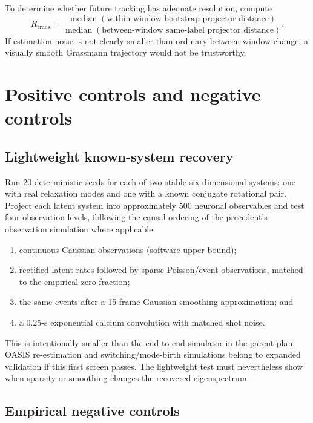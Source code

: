 \documentclass[11pt,a4paper]{article}
\begin{document}
To determine whether future tracking has adequate resolution, compute
\begin{equation}
 R_{\mathrm{track}}=
 \frac{\operatorname{median}(\text{within-window bootstrap projector distance})}
      {\operatorname{median}(\text{between-window same-label projector distance})}.
\end{equation}
If estimation noise is not clearly smaller than ordinary between-window change,
a visually smooth Grassmann trajectory would not be trustworthy.

\section{Positive controls and negative controls}

\subsection{Lightweight known-system recovery}

Run 20 deterministic seeds for each of two stable six-dimensional systems: one
with real relaxation modes and one with a known conjugate rotational pair.
Project each latent system into approximately 500 neuronal observables and test
four observation levels, following the causal ordering of the precedent's
observation simulation where applicable:

\begin{enumerate}
  \item continuous Gaussian observations (software upper bound);
  \item rectified latent rates followed by sparse Poisson/event observations,
  matched to the empirical zero fraction;
  \item the same events after a 15-frame Gaussian smoothing approximation; and
  \item a 0.25-s exponential calcium convolution with matched shot noise.
\end{enumerate}

This is intentionally smaller than the end-to-end simulator in the parent plan.
OASIS re-estimation and switching/mode-birth simulations belong to expanded
validation if this first screen passes. The lightweight test must nevertheless
show when sparsity or smoothing changes the recovered eigenspectrum.

\subsection{Empirical negative controls}
\end{document}
